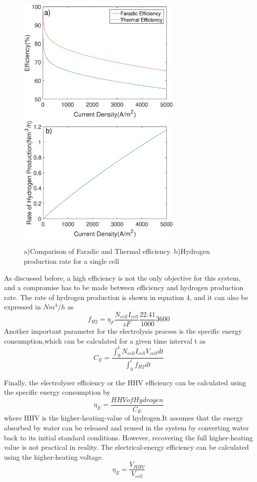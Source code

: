\begin{figure}[H]
\includegraphics[width=8cm]{efficiency.eps} 
\includegraphics[width=8cm]{rate.eps}
\caption{a)Comparison of Faradic and Thermal efficiency. b)Hydrogen production rate for a single cell}
\end{figure} 

As discussed before, a high efficiency is not the only objective for this system, and a compromise has to be made between efficiency and hydrogen production rate. The rate of hydrogen production is shown in equation 4, and it can also be expressed in $Nm^3/h$ as
\begin{equation} 
 f_{H2} = \eta_F \frac{N_{cell}I_{cell}}{zF}\frac{22.41}{1000}3600
\end{equation} 
Another important parameter for the electrolysis process is the specific energy consumption,which can be calculated for a given time interval t as
\begin{equation}
C_E = \frac{\int_{0}^{t} N_{cell}  {I_{cell}}  V_{cell} dt}{\int_{0}^{t} f_{H2}dt}
\end{equation}

Finally, the electrolyser efficiency or the HHV efficiency can be calculated using the specific energy consumption by
\begin{equation}
\eta_E = \frac{HHV of Hydrogen}{C_E} 
\end{equation}
where HHV is the higher-heating-value of hydrogen.It assumes that the energy absorbed by water can be released and reused in the system by converting water back to its initial standard conditions. However, recovering the full higher-heating value is not practical in reality.
The electrical-energy efficiency can be calculated using the higher-heating voltage.\cite{efficiency} \cite{efficiency2} 
\begin{equation}
\eta_E=\frac{V_{HHV}}{V_{cell}}
\end{equation}

